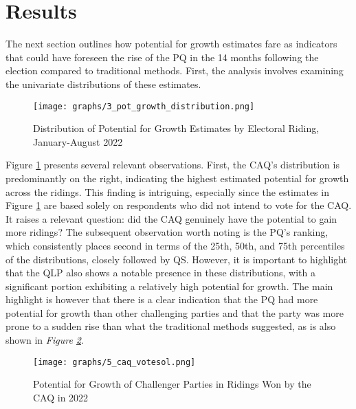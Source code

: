 \documentclass[
  journal=medium,
  manuscript=article-type,
  year=2024
]{cup-journal}
\begin{document}
\section{Results}

The next section outlines how potential for growth estimates fare as indicators that could have foreseen the rise of the PQ in the 14 months following the election compared to traditional methods. First, the analysis involves examining the univariate distributions of these estimates.

\begin{figure}[!htb]
    \centering
    \texttt{[image: graphs/3\_pot\_growth\_distribution.png]}
    \caption{Distribution of Potential for Growth Estimates by Electoral Riding, January-August 2022}
    \label{fig:potgrowthdist}
\end{figure}

Figure \ref{fig:potgrowthdist} presents several relevant observations. First, the CAQ's distribution is predominantly on the right, indicating the highest estimated potential for growth across the ridings. This finding is intriguing, especially since the estimates in Figure \ref{fig:potgrowthdist} are based solely on respondents who did not intend to vote for the CAQ. It raises a relevant question: did the CAQ genuinely have the potential to gain more ridings? The subsequent observation worth noting is the PQ's ranking, which consistently places second in terms of the 25th, 50th, and 75th percentiles of the distributions, closely followed by QS. However, it is important to highlight that the QLP also shows a notable presence in these distributions, with a significant portion exhibiting a relatively high potential for growth. The main highlight is however that there is a clear indication that the PQ had more potential for growth than other challenging parties and that the party was more prone to a sudden rise than what the traditional methods suggested, as is also shown in \textit{Figure \ref{fig:caqvotesol}}.

\begin{figure}[!htb]
    \centering
    \texttt{[image: graphs/5\_caq\_votesol.png]}
    \caption{Potential for Growth of Challenger Parties in Ridings Won by the CAQ in 2022}
    \label{fig:caqvotesol}
\end{figure}
\end{document}
